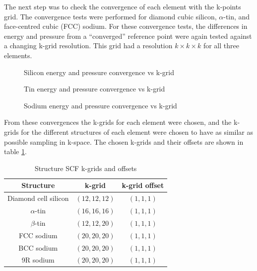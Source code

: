 \documentclass[12pt]{article}
\begin{document}
The next step was to check the convergence of each element with the k-points grid. The convergence tests were performed for diamond cubic silicon, $\alpha$-tin, and face-centred cubic (FCC) sodium. For these convergence tests, the differences in energy and pressure from a ``converged'' reference point were again tested against a changing k-grid resolution. This grid had a resolution $k\times k \times k$ for all three elements.

\begin{figure}
	\centering
	\subfloat{
		
}\qquad
\subfloat{
		
}\qquad
\caption{Silicon energy and pressure convergence vs k-grid}
\label{fig:silicon_k_convergence}
\end{figure}
\begin{figure}
	\centering
	\subfloat{
		
}\qquad
\subfloat{
		
}\qquad
\caption{Tin energy and pressure convergence vs k-grid}
\label{fig:tin_k_convergence}
\end{figure}
\begin{figure}
	\centering
	\subfloat{
		
}\qquad
\subfloat{
		
}\qquad
\caption{Sodium energy and pressure convergence vs k-grid}
\label{fig:sodium_k_convergence}
\end{figure}

From these convergences the k-grids for each element were chosen, and the k-grids for the different structures of each element were chosen to have as similar as possible sampling in k-space. The chosen k-grids and their offsets are shown in table \ref{tab:k-grids}.

\begin{table}
	\centering
	\begin{tabular}{|c|c|c|}
		\hline
		Structure & k-grid & k-grid offset \\
		\hline
		Diamond cell silicon & $(12, 12, 12)$ & $(1, 1, 1)$ \\
		$\alpha$-tin & $(16, 16, 16)$ & $(1, 1, 1)$ \\
		$\beta$-tin & $(12, 12, 20)$ & $(1, 1, 1)$ \\
		FCC sodium & $(20, 20, 20)$ & $(1, 1, 1)$ \\
		BCC sodium & $(20, 20, 20)$ & $(1, 1, 1)$ \\
		9R sodium & $(20, 20, 20)$ & $(1, 1, 1)$ \\
		\hline
	\end{tabular}
	\caption{Structure SCF k-grids and offsets}
	\label{tab:k-grids}
\end{table}
\end{document}
